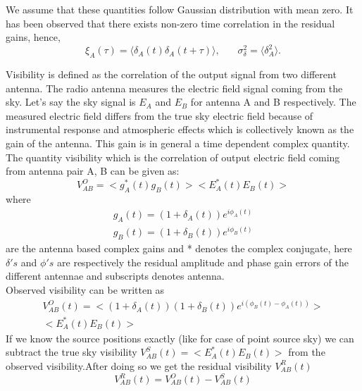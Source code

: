 \documentclass[fleqn,usenatbib]{mnras}
\begin{document}
We assume that these quantities follow Gaussian distribution with mean zero. It has been observed that there exists non-zero time correlation in the residual gains, hence,
\begin{equation}
\xi_A(\tau) = \langle \delta_A(t) \delta_A(t+\tau)\rangle,\ \ \ \ \ \ \ \  \sigma_{\delta}^2 =  \langle \delta_A^2 \rangle.
\end{equation}

Visibility is defined as the correlation of the output signal from two different antenna. The radio antenna measures the electric field signal coming from the sky. Let's say the sky signal is $E_A$ and $E_B$ for antenna A and B respectively. The measured electric field differs from the true sky electric field because of instrumental response and atmospheric effects which is collectively known as the gain of the antenna. This gain is in general a time dependent complex quantity. The quantity visibility which is the correlation of output electric field coming from antenna pair A, B can be given as:
\begin{equation}
    V_{AB}^O = <g^*_A(t)g_B(t)> < E^*_A(t)E_B(t)>
\end{equation}
where 
\begin{equation}
    \begin{split}
     g_A(t) = (1+\delta_A(t))e^{i\phi_A(t)} \\ g_B(t) = (1+\delta_B(t))e^{i\phi_B(t)}   
    \end{split}
\end{equation}
 are the antenna based complex gains and * denotes the complex conjugate, here $\delta's$ and $\phi's$ are respectively the residual amplitude and phase gain errors of the different antennae and subscripts denotes antenna.\\
Observed visibility can be written as
\begin{equation}
\begin{split}
    V_{AB}^O(t) = <(1+\delta_A(t))(1+\delta_B(t))e^{i(\phi_B(t)-\phi_A(t))}> \\ < E^*_A(t)E_B(t)>
\end{split}
\end{equation}
If we know the source positions exactly (like for case of point source sky) we can subtract the true sky visibility $V_{AB}^S(t) = <E^*_A(t)E_B(t)> $ from the observed visibility.After doing so we get the residual visibility $V^R_{AB}(t)$
\begin{equation}
    V_{AB}^R (t)= V_{AB}^O(t) - V_{AB}^S(t)
\end{equation}
\end{document}
